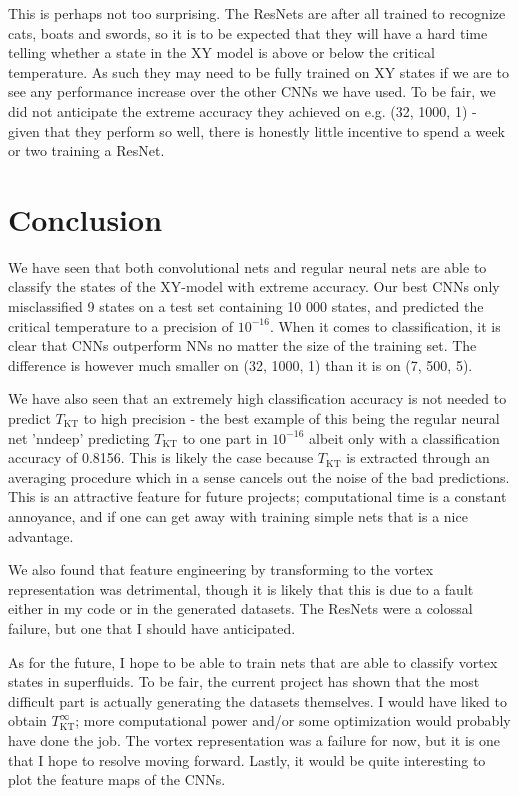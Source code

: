 \documentclass[]{article}
\begin{document}
This is perhaps not too surprising. The ResNets are after all trained to recognize cats, boats and swords, so it is to be expected that they will have a hard time telling whether a state in the XY model is above or below the critical temperature. As such they may need to be fully trained on XY states if we are to see any performance increase over the other CNNs we have used. To be fair, we did not anticipate the extreme accuracy they achieved on e.g. (32, 1000, 1) - given that they perform so well, there is honestly little incentive to spend a week or two training a ResNet.


\section{Conclusion}
We have seen that both convolutional nets and regular neural nets are able to classify the states of the XY-model with extreme accuracy. Our best CNNs only misclassified 9 states on a test set containing 10 000 states, and predicted the critical temperature to a precision of $10^{-16}$. When it comes to classification, it is clear that CNNs outperform NNs no matter the size of the training set. The difference is however much smaller on (32, 1000, 1) than it is on (7, 500, 5). 

We have also seen that an extremely high classification accuracy is not needed to predict $T_\text{KT}$ to high precision - the best example of this being the regular neural net 'nndeep' predicting $T_\text{KT}$ to one part in $10^{-16}$ albeit only with a classification accuracy of 0.8156. This is likely the case because $T_\text{KT}$ is extracted through an averaging procedure which in a sense cancels out the noise of the bad predictions. This is an attractive feature for future projects; computational time is a constant annoyance, and if one can get away with training simple nets that is a nice advantage.

We also found that feature engineering by transforming to the vortex representation was detrimental, though it is likely that this is due to a fault either in my code or in the generated datasets. The ResNets were a colossal failure, but one that I should have anticipated. 

As for the future, I hope to be able to train nets that are able to classify vortex states in superfluids. To be fair, the current project has shown that the most difficult part is actually generating the datasets themselves. I would have liked to obtain $T_\text{KT}^\infty$; more computational power and/or some optimization would probably have done the job. The vortex representation was a failure for now, but it is one that I hope to resolve moving forward. Lastly, it would be quite interesting to plot the feature maps of the CNNs.




\end{document}
